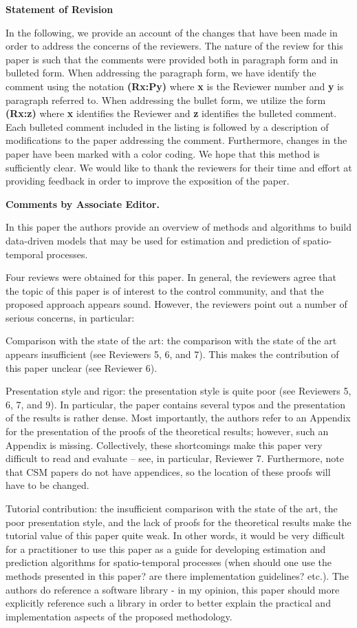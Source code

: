 \documentclass{letter}
\begin{document}
\centerline{{\bf \large Statement of Revision}}

In the following, we provide an account of the changes that have been made
in order to address the concerns of the reviewers.  The nature of
the review for this paper is such that the comments were provided both
in paragraph form and in bulleted form.  When addressing the paragraph
form, we have identify the comment using the notation {\bf {\color{red}(Rx:Py)}} where 
{\bf x} is the Reviewer number and {\bf y} is paragraph referred to.
When addressing the bullet form, we utilize the form {\bf (Rx:z)} where
{\bf x} identifies the Reviewer and {\bf z} identifies the bulleted comment.
Each bulleted comment included in the listing is followed by a description
of modifications to the paper addressing the comment. Furthermore, changes in the paper have been marked with a color coding.  We hope that this
method is sufficiently clear.
We would like to thank the reviewers for their time and effort at providing
feedback in order to improve the exposition of the paper.

{\bf Comments by Associate Editor.}

In this paper the authors provide an overview of methods and algorithms
to build data-driven models that may be used for estimation and
prediction of spatio-temporal processes. 

Four reviews were obtained for this paper. In general, the reviewers
agree that the topic of this paper is of interest to the control
community, and that the proposed approach appears sound. However, the
reviewers point out a number of serious concerns, in particular:

Comparison with the state of the art: the comparison with the state
of the art appears insufficient (see Reviewers 5, 6, and 7). This makes
the contribution of this paper unclear (see Reviewer 6).

Presentation style and rigor: the presentation style is quite poor
(see Reviewers 5, 6, 7, and 9). In particular, the paper contains
several typos and the presentation of the results is rather dense. Most
importantly, the authors refer to an Appendix for the presentation of
the proofs of the theoretical results; however, such an Appendix is
missing. Collectively, these shortcomings make this paper very
difficult to read and evaluate -- see, in particular, Reviewer 7.
Furthermore, note that CSM papers do not have appendices, 
so the location of these proofs will have to be changed.

Tutorial contribution: the insufficient comparison with the state of
the art, the poor presentation style, and the lack of proofs for the
theoretical results make the tutorial value of this paper quite weak.
In other words, it would be very difficult for a practitioner to use
this paper as a guide for developing estimation and prediction
algorithms for spatio-temporal processes (when should one use the
methods presented in this paper? are there implementation guidelines?
etc.). The authors do reference a software library - in my opinion,
this paper should more explicitly reference such a library in order to
better explain the practical and implementation aspects of the proposed
methodology.
\end{document}

